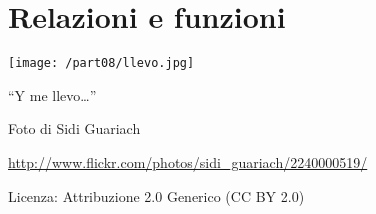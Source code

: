 \part{Relazioni e funzioni}

 \texttt{[image: /part08/llevo.jpg]}
   \begin{center}
     {\large ``Y me llevo\ldots''}\par
     Foto di Sidi Guariach\par
     \url{http://www.flickr.com/photos/sidi_guariach/2240000519/}\par
    Licenza: Attribuzione 2.0 Generico (CC BY 2.0)\par
   \end{center}
\clearpage
\cleardoublepage
